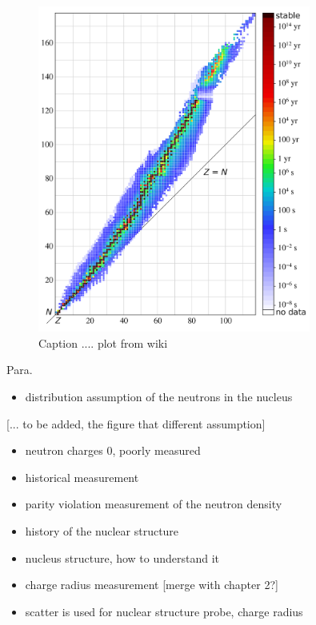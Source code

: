 \begin{figure}
    \centering
    \includegraphics[width=0.8\textwidth]{images/chap1/Isotopes_and_half-life.svg.png}
    \caption{Caption .... plot from wiki}
    \label{fig:isotopes_proton_neutron_ratio}
\end{figure}

Para.

\begin{itemize}
    \item distribution assumption of the neutrons in the nucleus
\end{itemize}

[... to be added, the figure that different assumption]

\begin{itemize}
    \item neutron charges 0, poorly measured
    \item historical measurement 
    \item parity violation measurement of the neutron density
\end{itemize} 


\begin{itemize}
\item history of the nuclear structure
    \item nucleus structure, how to understand it
    \item charge radius measurement [merge with chapter 2?]
    \item scatter is used for nuclear structure probe, charge radius 
\end{itemize}



